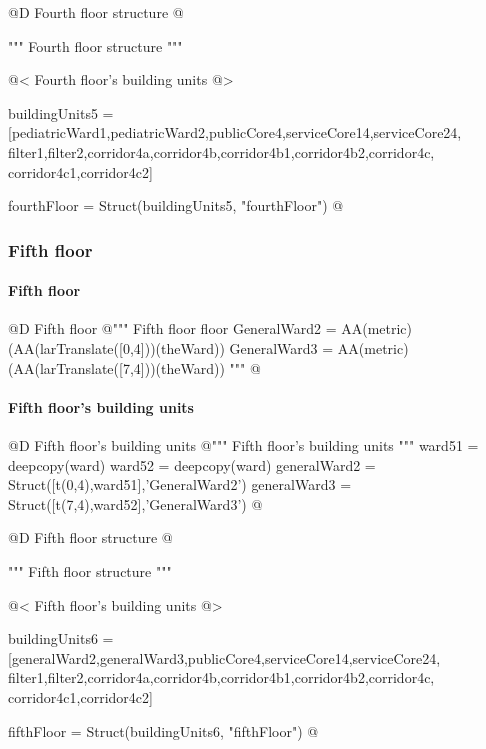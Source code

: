 \documentclass[11pt,oneside]{article}    %
\begin{document}
@D Fourth floor structure
@{""" Fourth floor structure """

@< Fourth floor's building units @>

buildingUnits5 = [pediatricWard1,pediatricWard2,publicCore4,serviceCore14,serviceCore24,
                filter1,filter2,corridor4a,corridor4b,corridor4b1,corridor4b2,corridor4c,
                corridor4c1,corridor4c2]

fourthFloor = Struct(buildingUnits5, "fourthFloor")
@}


\subsubsection{Fifth floor}
\paragraph{Fifth floor}
@D Fifth floor
@{""" Fifth floor floor 
GeneralWard2 = AA(metric)(AA(larTranslate([0,4]))(theWard))
GeneralWard3 = AA(metric)(AA(larTranslate([7,4]))(theWard)) """
@}


\paragraph{Fifth floor's building units}
@D Fifth floor's building units 
@{""" Fifth floor's building units """
ward51 = deepcopy(ward)
ward52 = deepcopy(ward)
generalWard2 = Struct([t(0,4),ward51],'GeneralWard2')
generalWard3 = Struct([t(7,4),ward52],'GeneralWard3')
@}

@D Fifth floor structure
@{""" Fifth floor structure """

@< Fifth floor's building units @>

buildingUnits6 = [generalWard2,generalWard3,publicCore4,serviceCore14,serviceCore24,
                filter1,filter2,corridor4a,corridor4b,corridor4b1,corridor4b2,corridor4c,
                corridor4c1,corridor4c2]

fifthFloor = Struct(buildingUnits6, "fifthFloor")
@}
\end{document}

